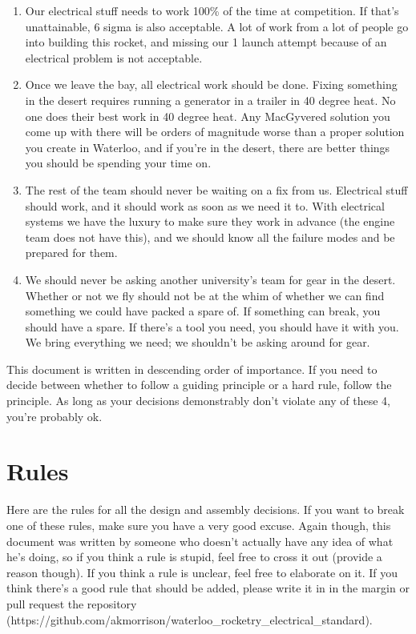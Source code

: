 \begin{enumerate}
\item Our electrical stuff needs to work 100\% of the time at competition. If that's unattainable, 6 sigma is also acceptable. A lot of work from a lot of people go into building this rocket, and missing our 1 launch attempt because of an electrical problem is not acceptable.
\item Once we leave the bay, all electrical work should be done. Fixing something in the desert requires running a generator in a trailer in 40 degree heat. No one does their best work in 40 degree heat. Any MacGyvered solution you come up with there will be orders of magnitude worse than a proper solution you create in Waterloo, and if you're in the desert, there are better things you should be spending your time on.
\item The rest of the team should never be waiting on a fix from us. Electrical stuff should work, and it should work as soon as we need it to. With electrical systems we have the luxury to make sure they work in advance (the engine team does not have this), and we should know all the failure modes and be prepared for them. 
\item We should never be asking another university's team for gear in the desert. Whether or not we fly should not be at the whim of whether we can find something we could have packed a spare of. If something can break, you should have a spare. If there's a tool you need, you should have it with you. We bring everything we need; we shouldn't be asking around for gear.
\end{enumerate}
This document is written in descending order of importance. If you need to decide between whether to follow a guiding principle or a hard rule, follow the principle. As long as your decisions demonstrably don't violate any of these 4, you're probably ok.

\section{Rules}
Here are the rules for all the design and assembly decisions. If you want to break one of these rules, make sure you have a very good excuse. Again though, this document was written by someone who doesn't actually have any idea of what he's doing, so if you think a rule is stupid, feel free to cross it out (provide a reason though). If you think a rule is unclear, feel free to elaborate on it. If you think there's a good rule that should be added, please write it in in the margin or pull request the repository (https://github.com/akmorrison/waterloo_rocketry_electrical_standard).

